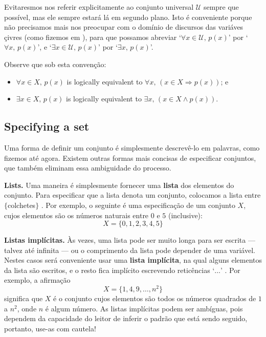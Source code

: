 Evitaresmos nos referir explicitamente ao conjunto universal $\mathcal{U}$ sempre que possível, mas ele sempre estará lá em segundo plano. Isto é conveniente porque não precisamos mais nos preocupar com o domínio de discursos das variáves ​​çivres (como fizemos em ), para que possamos abreviar `$\forall x \in \mathcal{U},\, p(x)$' por `$\forall x,\, p(x)$', e `$\exists x \in \mathcal{U},\, p(x)$' por `$\exists x,\, p(x)$'.

Observe que sob esta convenção:
\begin{itemize}
\item $\forall x \in X,\, p(x)$ is logically equivalent to $\forall x,\, (x \in X \Rightarrow p(x))$; e
\item $\exists x \in X,\, p(x)$ is logically equivalent to $\exists x,\, (x \in X \wedge p(x))$.
\end{itemize}

\subsection*{Specifying a set}
Uma forma de definir um conjunto é simplesmente descrevê-lo em palavras, como fizemos até agora. Existem outras formas mais concisas de especificar conjuntos, que também eliminam essa ambiguidade do processo.

\textbf{Lists.}
Uma maneira é simplesmente fornecer uma \textbf{lista} dos elementos do conjunto. Para especificar que a lista denota um conjunto, colocamos a lista entre $\{$colchetes$\}$ \lindexmmc{\{\dots\textbackslash{}\}}{$\{\dots\}$}. Por exemplo, o seguinte é uma especificação de um conjunto $X$, cujos elementos são os números naturais entre $0$ e $5$ (inclusive):
\[ X = \{ 0, 1, 2, 3, 4, 5 \} \]

\textbf{Listas implícitas.}
Às vezes, uma lista pode ser muito longa para ser escrita — talvez até infinita — ou o comprimento da lista pode depender de uma variável. Nestes casos será conveniente usar uma \textbf{lista implícita}, na qual alguns elementos da lista são escritos, e o resto fica implícito escrevendo reticências `$\dots$' . Por exemplo, a afirmação
\[ X = \{ 1, 4, 9, \dots, n^2 \} \]
significa que $X$ é o conjunto cujos elementos são todos os números quadrados de $1$ a $n^2$, onde $n$ é algum número. As listas implícitas podem ser ambíguas, pois dependem da capacidade do leitor de inferir o padrão que está sendo seguido, portanto, use-as com cautela!

